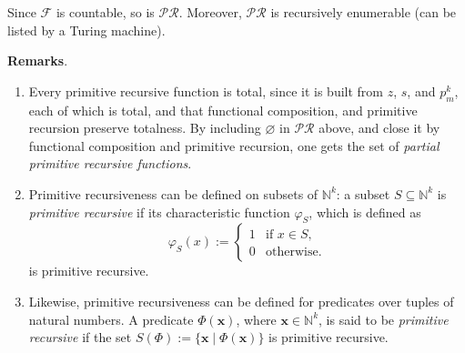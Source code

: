 \documentclass[12pt]{article}
\theoremstyle{definition}
\theoremstyle{remark}
\begin{document}
Since $\mathcal{F}$ is countable, so is $\mathcal{PR}$.  Moreover, $\mathcal{PR}$ is recursively enumerable (can be listed by a Turing machine).

\textbf{Remarks}.  
\begin{enumerate}
\item Every primitive recursive function is total, since it is built from $z$, $s$, and $p^k_m$, each of which is total, and that functional composition, and primitive recursion preserve totalness.  By including $\varnothing$ in $\mathcal{PR}$ above, and close it by functional composition and primitive recursion, one gets the set of \emph{partial primitive recursive functions}.
\item Primitive recursiveness can be defined on subsets of $\mathbb{N}^k$: a subset $S\subseteq \mathbb{N}^k$ is \emph{primitive recursive} if its characteristic function $\varphi_S$, which is defined as
\begin{displaymath}
\varphi_S(x):= \left\{
\begin{array}{ll}
1 & \textrm{if } x \in S, \\
0 & \textrm{otherwise.}
\end{array}
\right.
\end{displaymath}
is primitive recursive.
\item Likewise, primitive recursiveness can be defined for predicates over tuples of natural numbers.  A predicate $\Phi(\boldsymbol{x})$, where $\boldsymbol{x}\in \mathbb{N}^k$, is said to be \emph{primitive recursive} if the set $S(\Phi):=\lbrace \boldsymbol{x}\mid \Phi(\boldsymbol{x})\rbrace$ is primitive recursive.
\end{enumerate}
\end{document}
